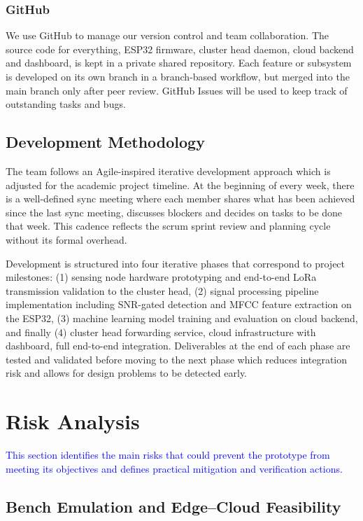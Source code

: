\documentclass[12pt,a4paper,oneside]{memoir}
\newcommand{\earlierrevision}[1]{\textcolor{blue}{#1}}
\begin{document}
\subsubsection{GitHub}

We use GitHub to manage our version control and team collaboration. The source code for everything, ESP32 firmware, cluster head daemon, cloud backend and dashboard, is kept in a private shared repository. Each feature or subsystem is developed on its own branch in a branch-based workflow, but merged into the main branch only after peer review. GitHub Issues will be used to keep track of outstanding tasks and bugs.

\subsection{Development Methodology}
\label{sec:dev_methodology}

The team follows an Agile-inspired iterative development approach which is adjusted for the academic project timeline. At the beginning of every week, there is a well-defined sync meeting where each member shares what has been achieved since the last sync meeting, discusses blockers and decides on tasks to be done that week. This cadence reflects the scrum sprint review and planning cycle without its formal overhead.

Development is structured into four iterative phases that correspond to project milestones: (1) sensing node hardware prototyping and end-to-end LoRa transmission validation to the cluster head, (2) signal processing pipeline implementation including SNR-gated detection and MFCC feature extraction on the ESP32, (3) machine learning model training and evaluation on cloud backend, and finally (4) cluster head forwarding service, cloud infrastructure with dashboard, full end-to-end integration. Deliverables at the end of each phase are tested and validated before moving to the next phase which reduces integration risk and allows for design problems to be detected early.

\section{Risk Analysis}
\label{sec:RiskAnalysis}

\earlierrevision{This section identifies the main risks that could prevent the prototype from meeting its objectives and defines practical mitigation and verification actions.}

\subsection{Bench Emulation and Edge--Cloud Feasibility}
\end{document}
